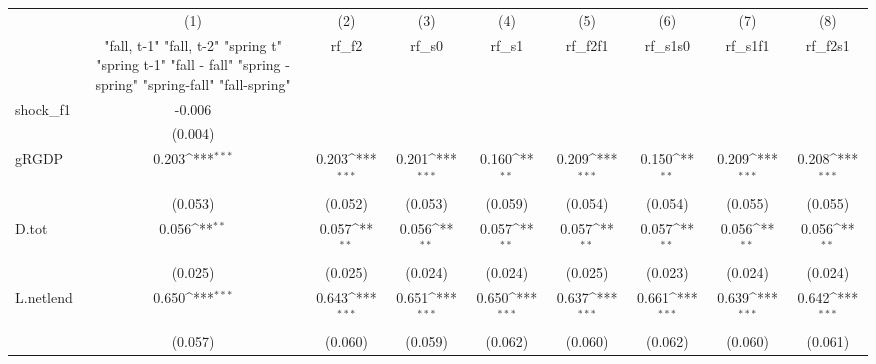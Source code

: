 {
\def\sym#1{\ifmmode^{#1}\else\(^{#1}\)\fi}
\begin{tabular}{l*{8}{c}}
\toprule
            &\multicolumn{1}{c}{(1)}&\multicolumn{1}{c}{(2)}&\multicolumn{1}{c}{(3)}&\multicolumn{1}{c}{(4)}&\multicolumn{1}{c}{(5)}&\multicolumn{1}{c}{(6)}&\multicolumn{1}{c}{(7)}&\multicolumn{1}{c}{(8)}\\
            &\multicolumn{1}{c}{  "fall, t-1" "fall, t-2" "spring t" "spring t-1"  "fall - fall" "spring - spring" "spring-fall" "fall-spring" }&\multicolumn{1}{c}{rf\_f2}&\multicolumn{1}{c}{rf\_s0}&\multicolumn{1}{c}{rf\_s1}&\multicolumn{1}{c}{rf\_f2f1}&\multicolumn{1}{c}{rf\_s1s0}&\multicolumn{1}{c}{rf\_s1f1}&\multicolumn{1}{c}{rf\_f2s1}\\
\midrule
shock\_f1    &      -0.006         &                     &                     &                     &                     &                     &                     &                     \\
            &     (0.004)         &                     &                     &                     &                     &                     &                     &                     \\
\addlinespace
gRGDP       &       0.203\sym{***}&       0.203\sym{***}&       0.201\sym{***}&       0.160\sym{**} &       0.209\sym{***}&       0.150\sym{**} &       0.209\sym{***}&       0.208\sym{***}\\
            &     (0.053)         &     (0.052)         &     (0.053)         &     (0.059)         &     (0.054)         &     (0.054)         &     (0.055)         &     (0.055)         \\
\addlinespace
D.tot       &       0.056\sym{**} &       0.057\sym{**} &       0.056\sym{**} &       0.057\sym{**} &       0.057\sym{**} &       0.057\sym{**} &       0.056\sym{**} &       0.056\sym{**} \\
            &     (0.025)         &     (0.025)         &     (0.024)         &     (0.024)         &     (0.025)         &     (0.023)         &     (0.024)         &     (0.024)         \\
\addlinespace
L.netlend   &       0.650\sym{***}&       0.643\sym{***}&       0.651\sym{***}&       0.650\sym{***}&       0.637\sym{***}&       0.661\sym{***}&       0.639\sym{***}&       0.642\sym{***}\\
            &     (0.057)         &     (0.060)         &     (0.059)         &     (0.062)         &     (0.060)         &     (0.062)         &     (0.060)         &     (0.061)         \\

\end{tabular}}
